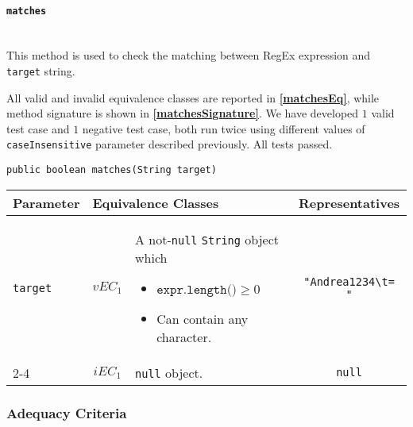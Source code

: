 \documentclass[sigconf]{acmart}
\begin{document}
\paragraph{\texttt{matches}}
\hfill\\
This method is used to check the matching between RegEx expression and \texttt{target} string.  

All valid and invalid equivalence classes are reported in \textbf{\cref{matchesEq}}, while method signature is shown in \textbf{\cref{matchesSignature}}. We have developed $1$ valid test case and $1$ negative test case, both run twice using different values of \texttt{caseInsensitive} parameter described previously. All tests passed.

\begin{lstlisting}[frame=lines,basicstyle=\ttfamily\tiny, caption={Signature of method \texttt{matches}}, label={matchesSignature}]
public boolean matches(String target)
\end{lstlisting}

\begin{table*}
\footnotesize
\caption{Equivalence classes and representatives of \texttt{matches} method}
\label{matchesEq}
\centering
\begin{tabular}{l|cm{10.5cm}|c}
\toprule
    \textbf{Parameter} & \multicolumn{2}{|l|}{\textbf{Equivalence Classes}} & \textbf{Representatives} \\
    \midrule
    
	\texttt{target} & $vEC_1$ & A not-\texttt{null} \texttt{String} object which
	\begin{itemize}
	\item  $\texttt{expr.length()} \geq 0$
	\item Can contain any character. 
\end{itemize}		
	& \texttt{"Andrea1234\textbackslash t= "}
    
    \\\cline{2-4}   
    
    & $iEC_1$ & \texttt{null} object. & \texttt{null} 
   
    
     \\  
    
    \bottomrule
  \end{tabular}
\end{table*}

\subsubsection{Adequacy Criteria}
\hfill\\
\end{document}
